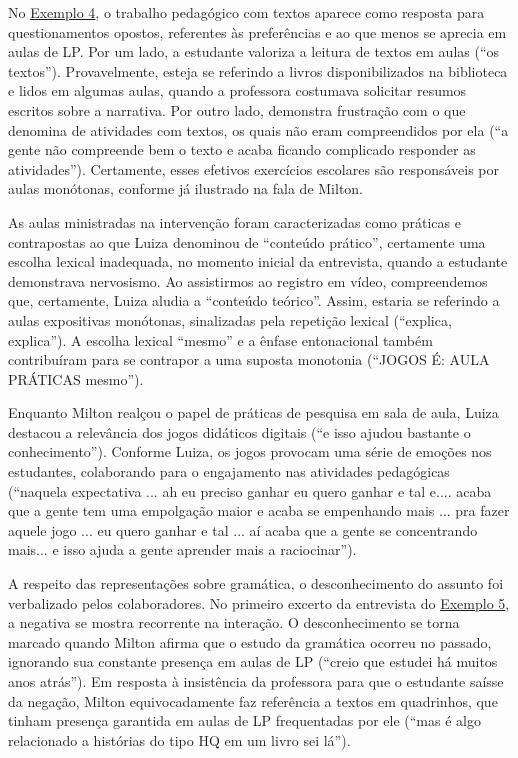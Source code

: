 No \hyperref[tab-05]{Exemplo 4}, o trabalho pedagógico com textos aparece como resposta
para questionamentos opostos, referentes às preferências e ao que menos
se aprecia em aulas de LP. Por um lado, a estudante valoriza a leitura
de textos em aulas (``os textos''). Provavelmente, esteja se referindo a
livros disponibilizados na biblioteca e lidos em algumas aulas, quando a
professora costumava solicitar resumos escritos sobre a narrativa. Por
outro lado, demonstra frustração com o que denomina de atividades com
textos, os quais não eram compreendidos por ela (``a gente não
compreende bem o texto e acaba ficando complicado responder as
atividades''). Certamente, esses efetivos exercícios escolares são
responsáveis por aulas monótonas, conforme já ilustrado na fala de
Milton.



As aulas ministradas na intervenção foram caracterizadas como práticas e
contrapostas ao que Luiza denominou de ``conteúdo prático'', certamente
uma escolha lexical inadequada, no momento inicial da entrevista, quando
a estudante demonstrava nervosismo. Ao assistirmos ao registro em vídeo,
compreendemos que, certamente, Luiza aludia a ``conteúdo teórico''.
Assim, estaria se referindo a aulas expositivas monótonas, sinalizadas
pela repetição lexical (``explica, explica''). A escolha lexical
``mesmo'' e a ênfase entonacional também contribuíram para se contrapor
a uma suposta monotonia (``JOGOS É: AULA PRÁTICAS mesmo'').


Enquanto Milton realçou o papel de práticas de pesquisa em sala de aula,
Luiza destacou a relevância dos jogos didáticos digitais (``e isso
ajudou bastante o conhecimento''). Conforme Luiza, os jogos provocam uma
série de emoções nos estudantes, colaborando para o engajamento nas
atividades pedagógicas (``naquela expectativa ... ah eu preciso ganhar
eu quero ganhar e tal e.... acaba que a gente tem uma empolgação maior e
acaba se empenhando mais ... pra fazer aquele jogo ... eu quero ganhar e
tal ... aí acaba que a gente se concentrando mais... e isso ajuda a
gente aprender mais a raciocinar'').

A respeito das representações sobre gramática, o desconhecimento do
assunto foi verbalizado pelos colaboradores. No primeiro excerto da
entrevista do \hyperref[tab-06]{Exemplo 5}, a negativa se mostra recorrente na interação. O
desconhecimento se torna marcado quando Milton afirma que o estudo da
gramática ocorreu no passado, ignorando sua constante presença em aulas
de LP (``creio que estudei há muitos anos atrás''). Em resposta à
insistência da professora para que o estudante saísse da negação, Milton
equivocadamente faz referência a textos em quadrinhos, que tinham
presença garantida em aulas de LP frequentadas por ele (``mas é algo
relacionado a histórias do tipo HQ em um livro sei lá'').

